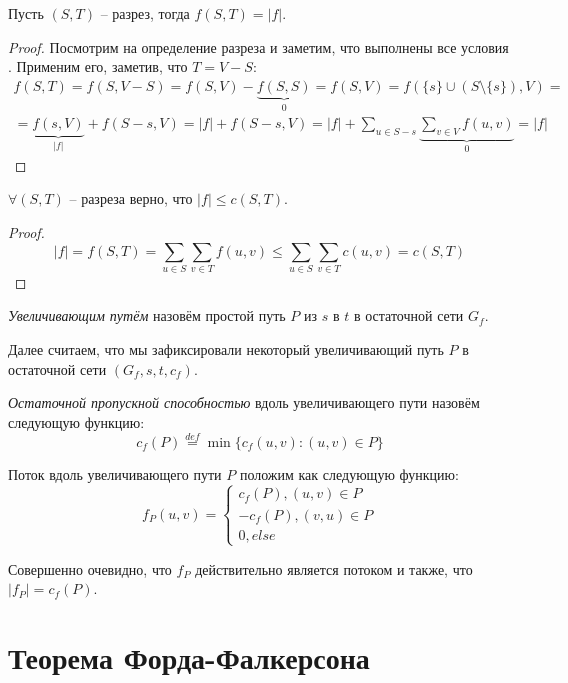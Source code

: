 \Lm Пусть $(S, T)$ -- разрез, тогда $f(S, T) = |f|$.
\begin{proof}
    
    Посмотрим на определение разреза и заметим, что выполнены все условия . Применим его, заметив, что $T = V - S$:
    \begin{multline*}
        f(S, T) = f(S, V - S) = f(S, V) - \underbrace{f(S, S)}_{0} = f(S, V) = f(\{s\} \cup (S \setminus \{s\}), V) = \\
        = \underbrace{f(s, V)}_{|f|} + f(S - s, V) = |f| + f(S - s, V) = |f| + \sum\limits_{u \in S - s} \underbrace{\sum\limits_{v \in V} f(u, v)}_{0} = |f|
    \end{multline*} 
\end{proof}

 $\forall (S, T)$ -- разреза верно, что $|f| \leq c(S, T)$.
\begin{proof}
    \begin{equation*}
        |f| = f(S, T) = \sum\limits_{u \in S} \sum\limits_{v \in T} f(u, v) \leq \sum\limits_{u \in S} \sum\limits_{v \in T} c(u, v) = c(S, T)
    \end{equation*}
\end{proof}

\Def \textit{Увеличивающим путём} назовём простой путь $P$ из $s$ в $t$ в остаточной сети $G_f$.

Далее считаем, что мы зафиксировали некоторый увеличивающий путь $P$ в остаточной сети $(G_f, s, t, c_f)$.

\Def \textit{Остаточной пропускной способностью} вдоль увеличивающего пути назовём следующую функцию:
\begin{equation*}
    c_f(P) \overset{def}{=} \min\{ c_f(u, v): (u, v) \in P \}
\end{equation*}

\Def Поток вдоль увеличивающего пути $P$ положим как следующую функцию:
\begin{equation*}
    f_P(u, v) = \begin{cases}
        c_f(P), (u, v) \in P \\
        -c_f(P), (v, u) \in P \\
        0, else
    \end{cases}
\end{equation*}

Совершенно очевидно, что $f_P$ действительно является потоком и также, что $|f_P| = c_f(P)$.

\section{Теорема Форда-Фалкерсона}


